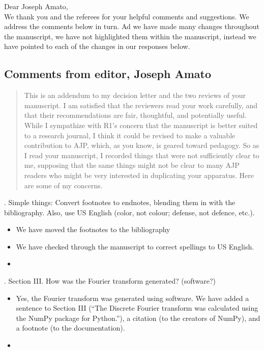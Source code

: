 \documentclass{article}
\begin{document}
\noindent Dear Joseph Amato, \\

\noindent We thank you and the referees for your helpful comments and suggestions. 
We address the comments below in turn. 
Ad we have made many changes throughout the manuscript, we have not highlighted them within the manuscript, instead we have pointed to each of the changes in our responses below. 

\subsection*{Comments from editor, Joseph Amato}
\begin{quote}
This is an addendum to my decision letter and the two reviews of your manuscript.  I am satisfied that the reviewers read your work carefully, and that their recommendations are fair, thoughtful, and potentially useful.  While I sympathize with R1’s concern that the manuscript is better suited to a research journal, I think it could be revised to make a valuable contribution to AJP, which, as you know, is geared toward pedagogy.  So as I read your manuscript, I recorded things that were not sufficiently clear to me, supposing that the same things might not be clear to many AJP readers who might be very interested in duplicating your apparatus.  Here are some of my concerns.
\end{quote}

. Simple things: Convert footnotes to endnotes, blending them in with the bibliography.  Also, use US English (color, not colour; defense, not defence, etc.). 
\begin{itemize}
\item We have moved the footnotes to the bibliography
\item We have checked through the manuscript to correct spellings to US English. 
\item[]
\end{itemize}

. Section III.  How was the Fourier transform generated?  (software?)
\begin{itemize}
\item Yes, the Fourier transform was generated using software. We have added a sentence to Section III (``The Discrete Fourier transform was calculated using the NumPy package for Python.''), a citation (to the creators of NumPy), and a footnote (to the documentation).
\item[]
\end{itemize}
\end{document}
